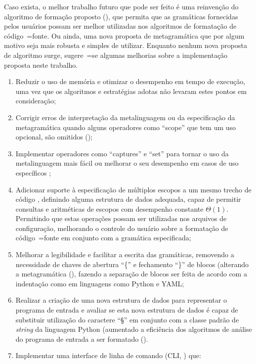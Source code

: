 Caso exista,
o melhor trabalho futuro que pode ser feito é uma reinvenção do algoritmo de formação proposto (),
que permita que as gramáticas fornecidas pelos usuários possam ser melhor utilizadas nos algoritmos de formatação de código~=fonte.
Ou ainda,
uma nova proposta de metagramática que por algum motivo seja mais robusta e
simples de utilizar.
Enquanto nenhum nova proposta de algoritmo surge,
sugere~=se algumas melhorias sobre a implementação proposta neste trabalho.
\begin{enumerate}
\item Reduzir o uso de memória e
otimizar o desempenho em tempo de execução,
uma vez que os algoritmos e
estratégias adotas não levaram estes pontos em consideração;
\item Corrigir erros de interpretação da metalinguagem ou
da especificação da metagramática quando alguns operadores como ``scope'' que tem um uso opcional,
são omitidos ();
\item Implementar operadores como ``captures'' e
``set'' para tornar o uso da metalinguagem mais fácil ou
melhorar o seu desempenho em casos de uso específicos \cite{sublimeTextSyntax};
\item Adicionar suporte à especificação de múltiplos escopos a um mesmo trecho de código \cite{vsCodeSyntaxHighlighthing},
definindo alguma estrutura de dados adequada,
capaz de permitir consultas e
aritméticas de escopos \cite{textMateScopeExclusion} com desempenho constante $\Theta(1)$.
Permitindo que estas operações possam ser utilizadas nos arquivos de configuração,
melhorando o controle do usuário sobre a formatação de código~=fonte em conjunto com a gramática especificada;
\item Melhorar a legibilidade e
facilitar a escrita das gramáticas,
removendo a necessidade de chaves de abertura ``\{'' e
fechamento ``\}'' de blocos (alterando a metagramática (),
fazendo a separação de blocos ser feita de acordo com a indentação como em linguagens como Python e
YAML;
\item Realizar a criação de uma nova estrutura de dados para representar o programa de entrada e
avaliar se esta nova estrutura de dados é capaz de substituir utilização do caractere ``§'' em conjunto com a classe padrão de \textit{string} da linguagem Python (aumentado a eficiência dos algoritmos de análise do programa de entrada a ser formatado ().
\item Implementar uma interface de linha de comando (CLI, ) que:

\end{enumerate}

